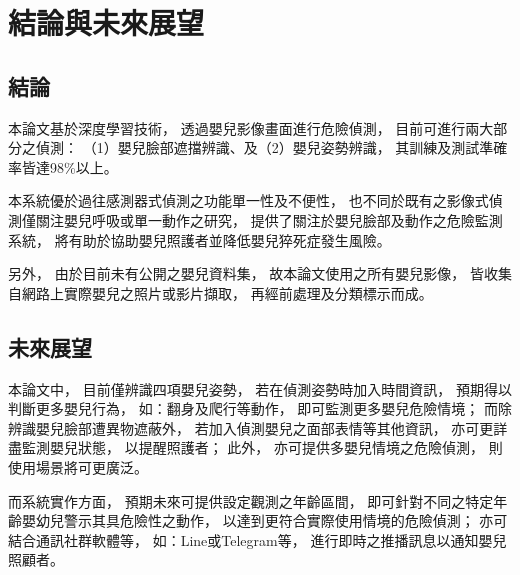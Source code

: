 \documentclass[class=NCU_thesis, crop=false]{standalone}
\begin{document}
\chapter{結論與未來展望}
\section{結論}
本論文基於深度學習技術，
透過嬰兒影像畫面進行危險偵測，
目前可進行兩大部分之偵測：
（1）嬰兒臉部遮擋辨識、及（2）嬰兒姿勢辨識，
其訓練及測試準確率皆達98\%以上。

本系統優於過往感測器式偵測之功能單一性及不便性，
也不同於既有之影像式偵測僅關注嬰兒呼吸或單一動作之研究，
提供了關注於嬰兒臉部及動作之危險監測系統，
將有助於協助嬰兒照護者並降低嬰兒猝死症發生風險。

另外，
由於目前未有公開之嬰兒資料集，
故本論文使用之所有嬰兒影像，
皆收集自網路上實際嬰兒之照片或影片擷取，
再經前處理及分類標示而成。

\newpage

\section{未來展望}
本論文中，
目前僅辨識四項嬰兒姿勢，
若在偵測姿勢時加入時間資訊，
預期得以判斷更多嬰兒行為，
如：翻身及爬行等動作，
即可監測更多嬰兒危險情境；
而除辨識嬰兒臉部遭異物遮蔽外，
若加入偵測嬰兒之面部表情等其他資訊，
亦可更詳盡監測嬰兒狀態，
以提醒照護者；
此外，
亦可提供多嬰兒情境之危險偵測，
則使用場景將可更廣泛。

而系統實作方面，
預期未來可提供設定觀測之年齡區間，
即可針對不同之特定年齡嬰幼兒警示其具危險性之動作，
以達到更符合實際使用情境的危險偵測；
亦可結合通訊社群軟體等，
如：Line或Telegram等，
進行即時之推播訊息以通知嬰兒照顧者。
\end{document}
